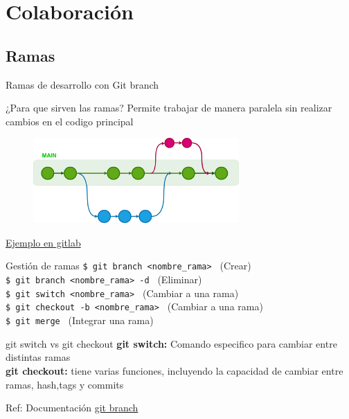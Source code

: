 \documentclass{beamer}
\begin{document}
\section{Colaboración}

\subsection {Ramas}

  \begin{frame}{Ramas de desarrollo con Git branch}

    \begin{alertblock}{¿Para que sirven las ramas?}
      Permite trabajar de manera paralela sin realizar cambios en el codigo principal
    \end{alertblock}


     \begin{figure}
      \includegraphics[width=0.7\textwidth]{images/git-branch.png}
     \end{figure}

     \href{https://gitlab.com/blancoapa/pyMBE}{Ejemplo en gitlab}



  \end{frame}

  \begin{frame}
    
    \begin{block}{ Gestión de ramas }
      {\texttt{\$ git branch <nombre\_rama> }}  (Crear)\\
      {\texttt{\$ git branch <nombre\_rama> -d }} (Eliminar) \\
      {\texttt{\$ git switch <nombre\_rama> }} (Cambiar a una rama) \\
      {\texttt{\$ git checkout -b <nombre\_rama> }} (Cambiar a una rama) \\
      {\texttt{\$ git merge }} (Integrar una rama) \\
    \end{block}

    \begin{exampleblock}{git switch vs git checkout }
      \textbf{git switch:} Comando especifico para cambiar entre distintas ramas \\
      \textbf{git checkout:} tiene varias funciones, incluyendo la capacidad de cambiar entre ramas, hash,tags y commits
    \end{exampleblock}

    Ref: Documentación \href{https://docs.github.com/es/pull-requests/collaborating-with-pull-requests/proposing-changes-to-your-work-with-pull-requests/creating-and-deleting-branches-within-your-repository}{git branch} 
  
  \end{frame}
\end{document}
